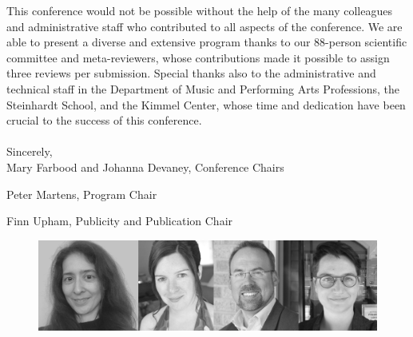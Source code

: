This conference would not be possible without the help of the many colleagues and administrative staff who contributed to all aspects of the conference.  We are able to present a diverse and extensive program thanks to our 88-person scientific committee and meta-reviewers, whose contributions made it possible to assign three reviews per submission.  Special thanks also to the administrative and technical staff in the Department of Music and Performing Arts Professions, the Steinhardt School, and the Kimmel Center, whose time and dedication have been crucial to the success of this conference.
\\
\\
Sincerely,
\\
\indent Mary Farbood and Johanna Devaney, Conference Chairs

Peter Martens, Program Chair

Finn Upham, Publicity and Publication Chair

\begin{figure}[H]
\centering
\includegraphics[width=1\linewidth]{images/Chairs_photo_2.png}
\end{figure}
